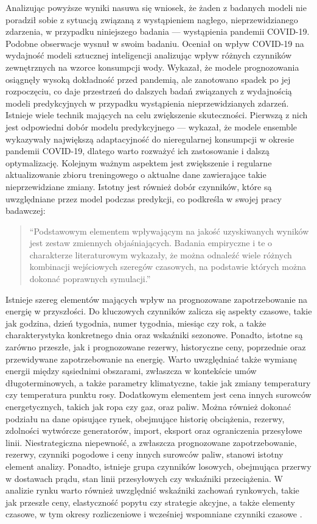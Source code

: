 \documentclass[polish, twoside, 12pt, a4paper]{article}
\theoremstyle{definition}
\theoremstyle{plain}
\theoremstyle{remark}
\begin{document}
Analizując powyższe wyniki nasuwa się wniosek, że żaden z badanych modeli nie poradził sobie z sytuacją związaną z wystąpieniem nagłego, nieprzewidzianego zdarzenia, w przypadku niniejszego badania --- wystąpienia pandemii COVID-19. Podobne obserwacje wysnuł \cite{abutalib2023} w swoim badaniu. Oceniał on wpływ COVID-19 na wydajność modeli sztucznej inteligencji analizując wpływ różnych czynników zewnętrznych na wzorce konsumpcji wody. Wykazał, że modele prognozowania osiągnęły wysoką dokładność przed pandemią, ale zanotowano spadek po jej rozpoczęciu, co daje przestrzeń do dalszych badań związanych z wydajnością modeli predykcyjnych w przypadku wystąpienia nieprzewidzianych zdarzeń. Istnieje wiele technik mających na celu zwiększenie skuteczności. Pierwszą z nich jest odpowiedni dobór modelu predykcyjnego --- \cite{abutalib2023} wykazał, że modele ensemble wykazywały największą adaptacyjność do nieregularnej konsumpcji w okresie pandemii COVID-19, dlatego warto rozważyć ich zastosowanie i dalszą optymalizację. Kolejnym ważnym aspektem jest zwiększenie i regularne aktualizowanie zbioru treningowego o aktualne dane zawierające takie nieprzewidziane zmiany. Istotny jest również dobór czynników, które są uwzględniane przez model podczas predykcji, co podkreśla \cite{jasiński2014} w swojej pracy badawczej:

\begin{quote}
\enquote{Podstawowym elementem wpływającym na jakość uzyskiwanych wyników jest zestaw zmiennych objaśniających. Badania empiryczne i te o charakterze literaturowym wykazały, że można odnaleźć wiele różnych kombinacji wejściowych szeregów czasowych, na podstawie których można dokonać poprawnych symulacji.}
\end{quote}

Istnieje szereg elementów mających wpływ na prognozowane zapotrzebowanie na energię w przyszłości. Do kluczowych czynników zalicza się aspekty czasowe, takie jak godzina, dzień tygodnia, numer tygodnia, miesiąc czy rok, a także charakterystyka konkretnego dnia oraz wskaźniki sezonowe. Ponadto, istotne są zarówno przeszłe, jak i prognozowane rezerwy, historyczne ceny, poprzednie oraz przewidywane zapotrzebowanie na energię. Warto uwzględniać także wymianę energii między sąsiednimi obszarami, zwłaszcza w kontekście umów długoterminowych, a także parametry klimatyczne, takie jak zmiany temperatury czy temperatura punktu rosy. Dodatkowym elementem jest cena innych surowców energetycznych, takich jak ropa czy gaz, oraz paliw. Można również dokonać podziału na dane opisujące rynek, obejmujące historię obciążenia, rezerwy, zdolności wytwórcze generatorów, import, eksport oraz ograniczenia przesyłowe linii. Niestrategiczna niepewność, a zwłaszcza prognozowane zapotrzebowanie, rezerwy, czynniki pogodowe i ceny innych surowców paliw, stanowi istotny element analizy. Ponadto, istnieje grupa czynników losowych, obejmująca przerwy w dostawach prądu, stan linii przesyłowych czy wskaźniki przeciążenia. W analizie rynku warto również uwzględnić wskaźniki zachowań rynkowych, takie jak przeszłe ceny, elastyczność popytu czy strategie akcyjne, a także elementy czasowe, w tym okresy rozliczeniowe i wcześniej wspomniane czynniki czasowe \parencite{nejad2011, aggarwal2009}.
\end{document}

